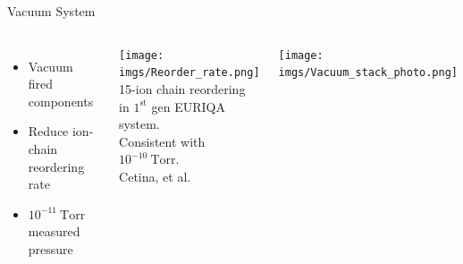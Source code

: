 \documentclass[final]{beamer}
\newlength{\colonewid}
\begin{document}
\begin{frame}[t]
\begin{columns}[t]
\begin{column}{\colonewid}
      \begin{block}{Vacuum System}
        \begin{center}
          \begin{columns}
            \column{16cm}
            \begin{itemize}
            \item Vacuum fired components
            \item Reduce ion-chain reordering rate
            \item $10^{-11}\ \mathrm{Torr}$ measured pressure
            \end{itemize}
            \begin{center}
              \texttt{[image: imgs/Reorder\_rate.png]}\\
              {\footnotesize 15-ion chain reordering
                in $1^{\text{st}}$ gen EURIQA system.}\\
              {\footnotesize Consistent with $10^{-10}\ \mathrm{Torr}$.}\\
              {\scriptsize Cetina, et al.}
            \end{center}
            \column{13cm}
            \texttt{[image: imgs/Vacuum\_stack\_photo.png]}
          \end{columns}
        \end{center}
      \end{block}


\end{column}
\end{columns}
\end{frame}
\end{document}
